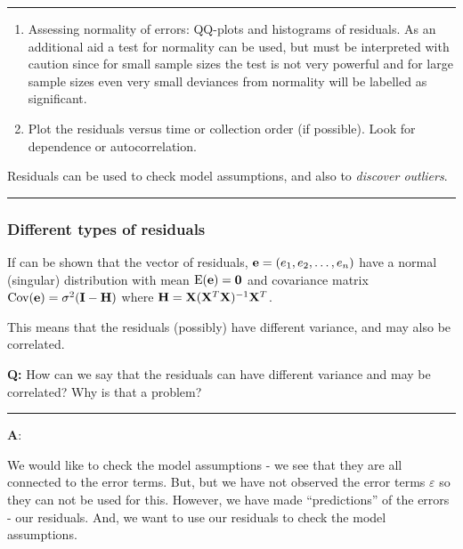 \documentclass[]{article}
\providecommand{\tightlist}{%
  \setlength{\itemsep}{0pt}\setlength{\parskip}{0pt}}
\begin{document}
\begin{center}\rule{0.5\linewidth}{\linethickness}\end{center}

\begin{enumerate}
\def\labelenumi{\arabic{enumi}.}
\setcounter{enumi}{2}
\tightlist
\item
  Assessing normality of errors: QQ-plots and histograms of residuals.
  As an additional aid a test for normality can be used, but must be
  interpreted with caution since for small sample sizes the test is not
  very powerful and for large sample sizes even very small deviances
  from normality will be labelled as significant.
\item
  Plot the residuals versus time or collection order (if possible). Look
  for dependence or autocorrelation.
\end{enumerate}

Residuals can be used to check model assumptions, and also to
\emph{discover outliers}.

\begin{center}\rule{0.5\linewidth}{\linethickness}\end{center}

\hypertarget{different-types-of-residuals}{%
\subsubsection{Different types of
residuals}\label{different-types-of-residuals}}

If can be shown that the vector of residuals,
\({\bf e}=(e_1,e_2,\ldots,e_n)\) have a normal (singular) distribution
with mean \(\text{E}({\bf e})={\bf 0}\) and covariance matrix
\(\text{Cov}({\bf e})=\sigma^2({\bf I}-{\bf H})\) where
\({\bf H}={\bf X}({\bf X}^T{\bf X})^{-1}{\bf X}^T\).

This means that the residuals (possibly) have different variance, and
may also be correlated.

\textbf{Q:} How can we say that the residuals can have different
variance and may be correlated? Why is that a problem?

\begin{center}\rule{0.5\linewidth}{\linethickness}\end{center}

\textbf{A}:

We would like to check the model assumptions - we see that they are all
connected to the error terms. But, but we have not observed the error
terms \(\varepsilon\) so they can not be used for this. However, we have
made ``predictions'' of the errors - our residuals. And, we want to use
our residuals to check the model assumptions.
\end{document}
